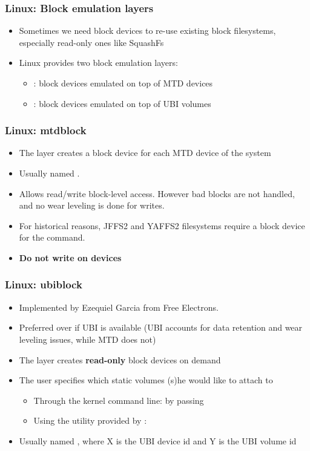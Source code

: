 \begin{frame}
  \frametitle{Linux: Block emulation layers}
  \begin{itemize}
  \item Sometimes we need block devices to re-use existing block
    filesystems, especially read-only ones like SquashFs
  \item Linux provides two block emulation layers:
    \begin{itemize}
    \item {}: block devices emulated on top of MTD devices
    \item {}: block devices emulated on top of UBI volumes
    \end{itemize}
  \end{itemize}
\end{frame}

\begin{frame}
  \frametitle{Linux: mtdblock}
  \begin{itemize}
  \item The  layer creates a block device for each MTD
    device of the system
  \item Usually named .
  \item Allows read/write block-level access. However bad blocks are not
    handled, and no wear leveling is done for writes.
  \item For historical reasons, JFFS2 and YAFFS2 filesystems require a
    block device for the  command.
  \item {\bf Do not write on  devices}
  \end{itemize}
\end{frame}

\begin{frame}
  \frametitle{Linux: ubiblock}
  \begin{itemize}
  \item Implemented by Ezequiel Garcia from Free Electrons.
  \item Preferred over  if UBI is available (UBI accounts
    for data retention and wear leveling issues, while MTD does not)
  \item The  layer creates {\bf read-only} block devices
    on demand
  \item The user specifies which static volumes (s)he would like to attach
    to 
    \begin{itemize}
    \item Through the kernel command line: by passing
    \item Using the  utility provided by :
    \end{itemize}
   \item Usually named , where X is the UBI device
     id and Y is the UBI volume id
  \end{itemize}
\end{frame}

